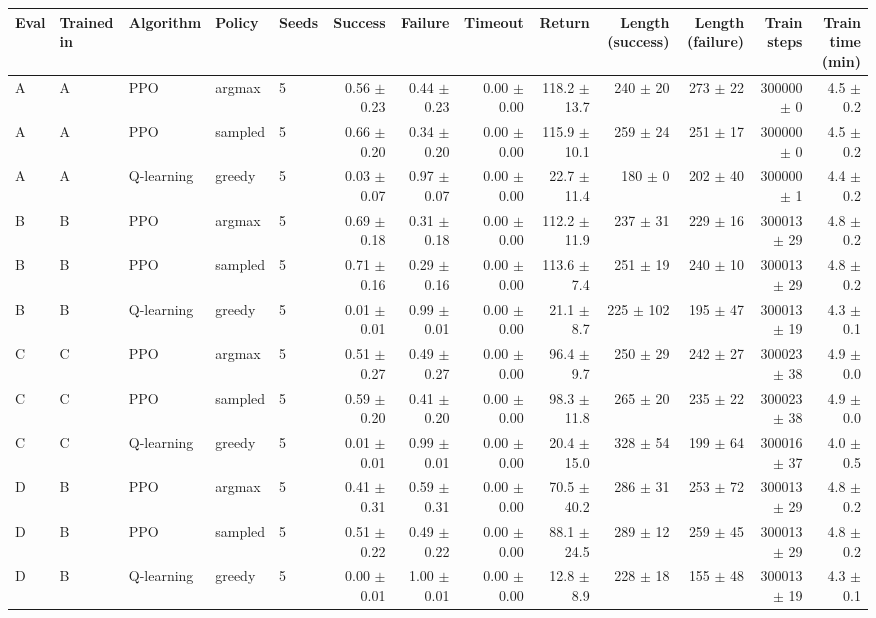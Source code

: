 \begin{tabular}{lllllrrrrrrrr}
\hline
Eval & Trained in & Algorithm & Policy & Seeds & Success & Failure & Timeout & Return & Length (success) & Length (failure) & Train steps & Train time (min) \\
\hline
A & A & PPO & argmax & 5 & 0.56 $\pm$ 0.23 & 0.44 $\pm$ 0.23 & 0.00 $\pm$ 0.00 & 118.2 $\pm$ 13.7 & 240 $\pm$ 20 & 273 $\pm$ 22 & 300000 $\pm$ 0 & 4.5 $\pm$ 0.2 \\
A & A & PPO & sampled & 5 & 0.66 $\pm$ 0.20 & 0.34 $\pm$ 0.20 & 0.00 $\pm$ 0.00 & 115.9 $\pm$ 10.1 & 259 $\pm$ 24 & 251 $\pm$ 17 & 300000 $\pm$ 0 & 4.5 $\pm$ 0.2 \\
A & A & Q-learning & greedy & 5 & 0.03 $\pm$ 0.07 & 0.97 $\pm$ 0.07 & 0.00 $\pm$ 0.00 & 22.7 $\pm$ 11.4 & 180 $\pm$ 0 & 202 $\pm$ 40 & 300000 $\pm$ 1 & 4.4 $\pm$ 0.2 \\
B & B & PPO & argmax & 5 & 0.69 $\pm$ 0.18 & 0.31 $\pm$ 0.18 & 0.00 $\pm$ 0.00 & 112.2 $\pm$ 11.9 & 237 $\pm$ 31 & 229 $\pm$ 16 & 300013 $\pm$ 29 & 4.8 $\pm$ 0.2 \\
B & B & PPO & sampled & 5 & 0.71 $\pm$ 0.16 & 0.29 $\pm$ 0.16 & 0.00 $\pm$ 0.00 & 113.6 $\pm$ 7.4 & 251 $\pm$ 19 & 240 $\pm$ 10 & 300013 $\pm$ 29 & 4.8 $\pm$ 0.2 \\
B & B & Q-learning & greedy & 5 & 0.01 $\pm$ 0.01 & 0.99 $\pm$ 0.01 & 0.00 $\pm$ 0.00 & 21.1 $\pm$ 8.7 & 225 $\pm$ 102 & 195 $\pm$ 47 & 300013 $\pm$ 19 & 4.3 $\pm$ 0.1 \\
C & C & PPO & argmax & 5 & 0.51 $\pm$ 0.27 & 0.49 $\pm$ 0.27 & 0.00 $\pm$ 0.00 & 96.4 $\pm$ 9.7 & 250 $\pm$ 29 & 242 $\pm$ 27 & 300023 $\pm$ 38 & 4.9 $\pm$ 0.0 \\
C & C & PPO & sampled & 5 & 0.59 $\pm$ 0.20 & 0.41 $\pm$ 0.20 & 0.00 $\pm$ 0.00 & 98.3 $\pm$ 11.8 & 265 $\pm$ 20 & 235 $\pm$ 22 & 300023 $\pm$ 38 & 4.9 $\pm$ 0.0 \\
C & C & Q-learning & greedy & 5 & 0.01 $\pm$ 0.01 & 0.99 $\pm$ 0.01 & 0.00 $\pm$ 0.00 & 20.4 $\pm$ 15.0 & 328 $\pm$ 54 & 199 $\pm$ 64 & 300016 $\pm$ 37 & 4.0 $\pm$ 0.5 \\
D & B & PPO & argmax & 5 & 0.41 $\pm$ 0.31 & 0.59 $\pm$ 0.31 & 0.00 $\pm$ 0.00 & 70.5 $\pm$ 40.2 & 286 $\pm$ 31 & 253 $\pm$ 72 & 300013 $\pm$ 29 & 4.8 $\pm$ 0.2 \\
D & B & PPO & sampled & 5 & 0.51 $\pm$ 0.22 & 0.49 $\pm$ 0.22 & 0.00 $\pm$ 0.00 & 88.1 $\pm$ 24.5 & 289 $\pm$ 12 & 259 $\pm$ 45 & 300013 $\pm$ 29 & 4.8 $\pm$ 0.2 \\
D & B & Q-learning & greedy & 5 & 0.00 $\pm$ 0.01 & 1.00 $\pm$ 0.01 & 0.00 $\pm$ 0.00 & 12.8 $\pm$ 8.9 & 228 $\pm$ 18 & 155 $\pm$ 48 & 300013 $\pm$ 19 & 4.3 $\pm$ 0.1 \\
\hline
\end{tabular}
